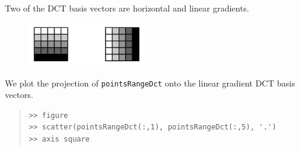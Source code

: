 \documentclass[amscd, amssymb, verbatim]{amsart}[12pt]
\theoremstyle{remark}
\theoremstyle{remark}
\theoremstyle{remark}
\begin{document}
Two of the DCT basis vectors are horizontal and linear gradients.

\vspace{-3mm}
\begin{figure}[htb]
	\centering
	\includegraphics[width=2in]{linearGrad}
\end{figure}
\vspace{-3mm}
\FloatBarrier

We plot the projection of \texttt{pointsRangeDct} onto the linear gradient DCT basis vectors.

\begin{quote} \begin{verbatim}
>> figure
>> scatter(pointsRangeDct(:,1), pointsRangeDct(:,5), '.')
>> axis square
\end{verbatim} \end{quote}

\begin{figure}[htp]
  \begin{center}
    \quad
   \end{center}
\end{figure}
\FloatBarrier
\end{document}
